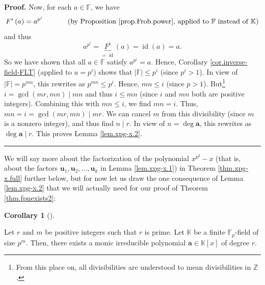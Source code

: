 \documentclass[numbers=enddot,12pt,final,onecolumn,notitlepage]{scrartcl}%
\theoremstyle{definition}
\newtheorem{coro}[theo]{Corollary}
\newenvironment{corollary}[1][]
{\begin{coro}[#1]\begin{leftbar}}
{\end{leftbar}\end{coro}}
\newenvironment{proof}[1][Proof]{\noindent\textbf{#1.} }{\ \rule{0.5em}{0.5em}}
\begin{document}
\begin{proof}
Now, for each $a\in\mathbb{F}$, we have%
\[
F^{i}\left(  a\right)  =a^{p^{i}}\ \ \ \ \ \ \ \ \ \ \left(  \text{by
Proposition \ref{prop.Frob.power}, applied to }\mathbb{F}\text{ instead of
}\mathbb{K}\right)
\]
and thus%
\[
a^{p^{i}}=\underbrace{F^{i}}_{=\operatorname*{id}}\left(  a\right)
=\operatorname*{id}\left(  a\right)  =a.
\]
So we have shown that all $a\in\mathbb{F}$ satisfy $a^{p^{i}}=a$. Hence,
Corollary \ref{cor.inverse-field-FLT} (applied to $u=p^{i}$) shows that
$\left\vert \mathbb{F}\right\vert \leq p^{i}$ (since $p^{i}>1$). In view of
$\left\vert \mathbb{F}\right\vert =p^{mn}$, this rewrites as $p^{mn}\leq
p^{i}$. Hence, $mn\leq i$ (since $p>1$). But\footnote{From this place on, all
divisibilities are understood to mean divisibilities in $\mathbb{Z}$.}
$i=\gcd\left(  mr,mn\right)  \mid mn$ and thus $i\leq mn$ (since $i$ and $mn$
both are positive integers). Combining this with $mn\leq i$, we find $mn=i$.
Thus, $mn=i=\gcd\left(  mr,mn\right)  \mid mr$. We can cancel $m$ from this
divisibility (since $m$ is a nonzero integer), and thus find $n\mid r$. In
view of $n=\deg\mathbf{a}$, this rewrites as $\deg\mathbf{a}\mid r$. This
proves Lemma \ref{lem.xpg-x.2}.
\end{proof}

We will say more about the factorization of the polynomial $x^{p^{g}}-x$ (that
is, about the factors $\mathbf{u}_{1},\mathbf{u}_{2},\ldots,\mathbf{u}_{k}$ in
Lemma \ref{lem.xpg-x.1}) in Theorem \ref{thm.xpg-x.full} further below, but
for now let us draw the one consequence of Lemma \ref{lem.xpg-x.2} that we
will actually need for our proof of Theorem \ref{thm.fpnexists2}:

\begin{corollary}
\label{cor.xpg-x.prime}Let $r$ and $m$ be positive integers such that $r$ is
prime. Let $\mathbb{K}$ be a finite $\mathbb{F}_{p}$-field of size $p^{m}$.
Then, there exists a monic irreducible polynomial $\mathbf{a}\in
\mathbb{K}\left[  x\right]  $ of degree $r$.
\end{corollary}
\end{document}
